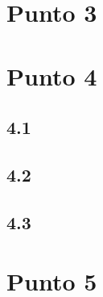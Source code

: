 \documentclass[aps,prl,reprint,rmp]{revtex4-1}
\begin{document}
\section{Punto 3}




\section{Punto 4}

\subsection{4.1}

\subsection{4.2}

\subsection{4.3}




\section{Punto 5}
\end{document}
